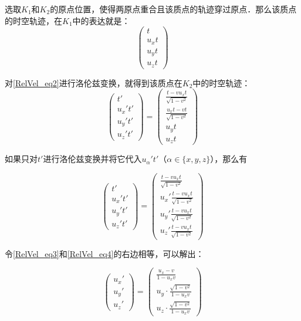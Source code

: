 选取$K_1$和$K_2$的原点位置，使得两原点重合且该质点的轨迹穿过原点．那么该质点的时空轨迹，在$K_1$中的表达就是：
\begin{equation}\label{RelVel_eq2}
\left(\begin{matrix}t\\u_xt\\u_yt\\u_zt\end{matrix} \right) 
\end{equation}

对\autoref{RelVel_eq2}进行洛伦兹变换，就得到该质点在$K_2$中的时空轨迹：
\begin{equation}\label{RelVel_eq3}
\left(\begin{matrix}t'\\u_x't'\\u_y't'\\u_z't'\end{matrix} \right) 
= 
\left(\begin{matrix}\frac{t-vu_xt}{\sqrt{1-v^2}}\\\frac{u_xt-vt}{\sqrt{1-v^2}}\\u_yt\\u_zt\end{matrix} \right) 
\end{equation}

如果只对$t'$进行洛伦兹变换并将它代入$u_\alpha't'$（$\alpha\in\{x, y, z\}$），那么有

\begin{equation}\label{RelVel_eq4}
\left(\begin{matrix}t'\\u_x't'\\u_y't'\\u_z't'\end{matrix} \right) 
= 
\left(\begin{matrix}\frac{t-vu_xt}{\sqrt{1-v^2}}\\u_x'\frac{t-vu_xt}{\sqrt{1-v^2}}\\u_y'\frac{t-vu_xt}{\sqrt{1-v^2}}\\u_z'\frac{t-vu_xt}{\sqrt{1-v^2}}\end{matrix} \right) 
\end{equation}

令\autoref{RelVel_eq3}和\autoref{RelVel_eq4}的右边相等，可以解出：

\begin{equation}
\left(\begin{matrix}u_x'\\u_y'\\u_z'\end{matrix} \right) 
= 
\left(\begin{matrix}\frac{u_x-v}{1-u_xv}\\u_y\cdot\frac{\sqrt{1-v^2}}{1-u_xv}\\u_z\cdot\frac{\sqrt{1-v^2}}{1-u_xv}\end{matrix} \right) 
\end{equation}

